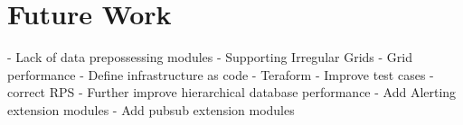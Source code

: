 \section{Future Work}
- Lack of data prepossessing modules
- Supporting Irregular Grids
- Grid performance
- Define infrastructure as code - Teraform
- Improve test cases - correct RPS
- Further improve hierarchical database performance
- Add Alerting extension modules
- Add pubsub extension modules
